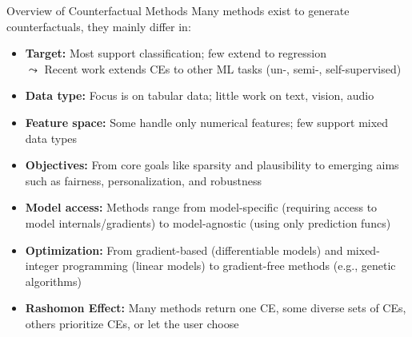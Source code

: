 \documentclass[10pt,compress,t,notes=noshow, xcolor=table]{beamer}
\begin{document}
\begin{frame}{Overview of Counterfactual Methods}
Many methods exist to generate counterfactuals, they mainly differ in:
    
	\begin{itemize}[<+->]
		  \item \textbf{Target:} Most support classification; few extend to regression\\
  $\leadsto$ Recent work extends CEs to other ML tasks (un-, semi-, self-supervised)
 \item \textbf{Data type:} Focus is on tabular data; little work on text, vision, audio
		\item \textbf{Feature space:} Some handle only numerical features; few support mixed data types
		\item \textbf{Objectives:} 
        From core goals like sparsity and plausibility to emerging aims such as fairness, personalization, and robustness
		\item \textbf{Model access:} 
        Methods range from model-specific (requiring access to model internals/gradients) to model-agnostic (using only prediction funcs)
		 \item \textbf{Optimization:} 
         From gradient-based (differentiable models) and mixed-integer programming (linear models) to gradient-free methods (e.g., genetic algorithms)
		\item \textbf{Rashomon Effect:} Many methods return one CE, some diverse sets of CEs, others prioritize CEs, or let the user choose
	\end{itemize}
\end{frame}
\end{document}
